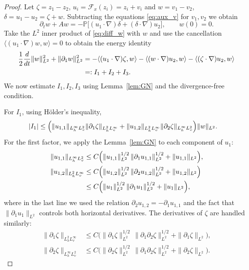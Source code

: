 \documentclass[11pt,a4paper,reqno]{amsart}
\theoremstyle{definition}
\begin{document}
\begin{proof}
  Let $\zeta = z_1-z_2$, $u_i = \mathcal F_x(z_i)=z_i+v_i$ and
  $w = v_1-v_2$, $\delta = u_1-u_2 = \zeta + w$.
  Subtracting the equations \eqref{eq:aux_v} for $v_1,v_2$ we obtain
  \begin{equation}\label{eq:diff_w}
    \partial_t w + A w = - \mathbb P\bigl[(u_1\cdot\nabla)\delta
    + (\delta\cdot\nabla)u_2\bigr], \qquad w(0)=0 .
  \end{equation}
  Take the $L^2$ inner product of \eqref{eq:diff_w} with $w$ and use the
  cancellation $\langle (u_1\cdot\nabla)w, w\rangle =0$
  to obtain the energy identity
  \begin{align}\label{eq:energy_w}
    \frac12 \frac{d}{dt}\|w\|_{L^2}^2 + \|\partial_1 w\|_{L^2}^2
    &= -\langle (u_1\cdot\nabla)\zeta, w\rangle
      - \langle (w\cdot\nabla)u_2, w\rangle
      - \langle (\zeta\cdot\nabla)u_2, w\rangle \notag\\
    &=: I_1 + I_2 + I_3 .
  \end{align}
  We now estimate $I_1,I_2,I_3$ using Lemma~\ref{lem:GN} and the
  divergence-free condition.

  For $I_1$, using H\"older's inequality,
\begin{align*}
  |I_1| &\le \Bigl( \|u_{1,1}\|_{L^\infty_h L^2_v} \|\partial_1\zeta\|_{L^2_h L^\infty_v}
          + \|u_{1,2}\|_{L^2_h L^\infty_v} \|\partial_2\zeta\|_{L^\infty_h L^2_v} \Bigr) \|w\|_{L^2}.
\end{align*}
For the first factor, we apply the Lemma~\ref{lem:GN} to each component of $u_1$:
\begin{align*}
  \|u_{1,1}\|_{L^\infty_h L^2_v}
  &\le C\Bigl(\|u_{1,1}\|_{L^2}^{1/2}\,\|\partial_1 u_{1,1}\|_{L^2}^{1/2}
            + \|u_{1,1}\|_{L^2}\Bigr),\\
  \|u_{1,2}\|_{L^2_h L^\infty_v}
  &\le C\Bigl(\|u_{1,2}\|_{L^2}^{1/2}\,\|\partial_2 u_{1,2}\|_{L^2}^{1/2}
            + \|u_{1,2}\|_{L^2}\Bigr) \\
  &\le C\Bigl(\|u_1\|_{L^2}^{1/2}\,\|\partial_1 u_1\|_{L^2}^{1/2}
            + \|u_1\|_{L^2}\Bigr),
\end{align*}
where in the last line we used the relation $\partial_2 u_{1,2} = -\partial_1 u_{1,1}$
and the fact that $\|\partial_1 u_1\|_{L^2}$ controls
both horizontal derivatives.  The derivatives of $\zeta$ are handled similarly:
\begin{align*}
  \|\partial_1\zeta\|_{L^2_h L^\infty_v}
  &\le C\bigl(\|\partial_1\zeta\|_{L^2}^{1/2}\,\|\partial_1\partial_2\zeta\|_{L^2}^{1/2}
      + \|\partial_1\zeta\|_{L^2}\bigr),\\
\|\partial_2\zeta\|_{L^\infty_h L^2_v}
  &\le C\bigl(\|\partial_2\zeta\|_{L^2}^{1/2}\,\|\partial_1\partial_2\zeta\|_{L^2}^{1/2}
      + \|\partial_2\zeta\|_{L^2}\bigr).
\end{align*}


\end{proof}
\end{document}
